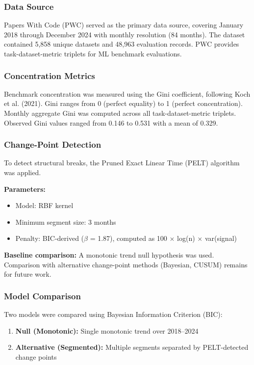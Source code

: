 
\subsubsection{Data Source}

Papers With Code (PWC) served as the primary data source, covering January 2018 through December 2024 with monthly resolution (84 months). The dataset contained 5,858 unique datasets and 48,963 evaluation records. PWC provides task-dataset-metric triplets for ML benchmark evaluations.

\subsubsection{Concentration Metrics}

Benchmark concentration was measured using the Gini coefficient, following Koch et al. (2021). Gini ranges from 0 (perfect equality) to 1 (perfect concentration). Monthly aggregate Gini was computed across all task-dataset-metric triplets. Observed Gini values ranged from 0.146 to 0.531 with a mean of 0.329.

\subsubsection{Change-Point Detection}

To detect structural breaks, the Pruned Exact Linear Time (PELT) algorithm \citep{killick2012optimal} was applied.

\textbf{Parameters:}
\begin{itemize}
\item Model: RBF kernel
\item Minimum segment size: 3 months
\item Penalty: BIC-derived ($\beta$ = 1.87), computed as 100 $\times$ log(n) $\times$ var(signal)
\end{itemize}

\textbf{Baseline comparison:} A monotonic trend null hypothesis was used. Comparison with alternative change-point methods (Bayesian, CUSUM) remains for future work.

\subsubsection{Model Comparison}

Two models were compared using Bayesian Information Criterion (BIC):
\begin{enumerate}
\item \textbf{Null (Monotonic):} Single monotonic trend over 2018--2024
\item \textbf{Alternative (Segmented):} Multiple segments separated by PELT-detected change points
\end{enumerate}

